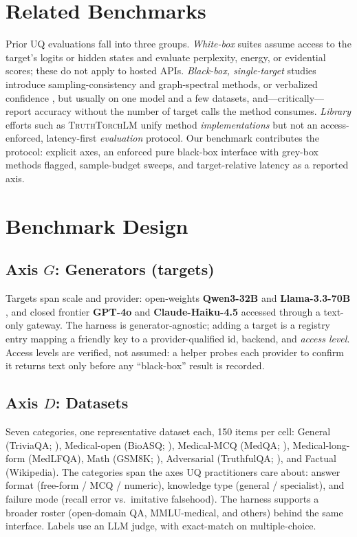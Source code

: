 \documentclass[11pt]{article}
\begin{document}
\section{Related Benchmarks}
Prior UQ evaluations fall into three groups. \emph{White-box} suites assume access to
the target's logits or hidden states and evaluate perplexity, energy, or evidential
scores; these do not apply to hosted APIs. \emph{Black-box, single-target} studies
introduce sampling-consistency \citep{kuhn2023semantic,farquhar2024detecting} and
graph-spectral \citep{lin2024generating} methods, or verbalized confidence
\citep{lin2022teaching}, but usually on one model and a few datasets, and---critically---%
report accuracy without the number of target calls the method consumes. \emph{Library}
efforts such as \textsc{TruthTorchLM} \citep{bakman2024truthtorchlm} unify method
\emph{implementations} but not an access-enforced, latency-first \emph{evaluation}
protocol. Our benchmark contributes the protocol: explicit axes, an enforced pure
black-box interface with grey-box methods flagged, sample-budget sweeps, and
target-relative latency as a reported axis.

\section{Benchmark Design}\label{sec:design}
\subsection{Axis $G$: Generators (targets)}
Targets span scale and provider: open-weights \textbf{Qwen3-32B}
\citep{yang2024qwen3} and \textbf{Llama-3.3-70B} \citep{dubey2024llama3}, and closed
frontier \textbf{GPT-4o} and \textbf{Claude-Haiku-4.5} accessed through a text-only
gateway. The harness is generator-agnostic; adding a target is a registry entry mapping a
friendly key to a provider-qualified id, backend, and \emph{access level}. Access levels
are verified, not assumed: a helper probes each provider to confirm it returns text only
before any ``black-box'' result is recorded.

\subsection{Axis $D$: Datasets}
Seven categories, one representative dataset each, 150 items per cell:
General (TriviaQA; \citealp{joshi2017triviaqa}), Medical-open (BioASQ;
\citealp{tsatsaronis2015bioasq}), Medical-MCQ (MedQA; \citealp{jin2021medqa}),
Medical-long-form (MedLFQA), Math (GSM8K; \citealp{cobbe2021gsm8k}), Adversarial
(TruthfulQA; \citealp{lin2021truthfulqa}), and Factual (Wikipedia). The categories span
the axes UQ practitioners care about: answer format (free-form / MCQ / numeric),
knowledge type (general / specialist), and failure mode (recall error vs.\ imitative
falsehood). The harness supports a broader roster (open-domain QA, MMLU-medical, and
others) behind the same interface. Labels use an LLM judge, with exact-match on
multiple-choice.
\end{document}
